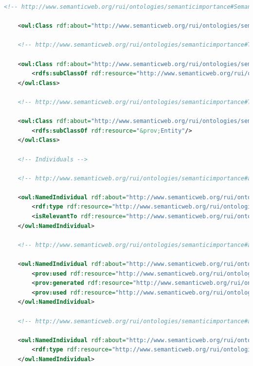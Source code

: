 \begin{lstlisting}[language=XML,caption={Semantic Importance Ontology File (update this file)}]
    <!-- http://www.semanticweb.org/rui/ontologies/semanticimportance#SemanticImportance -->

    <owl:Class rdf:about="http://www.semanticweb.org/rui/ontologies/semanticimportance#SemanticImportance"/>

    <!-- http://www.semanticweb.org/rui/ontologies/semanticimportance#TemporalProvenance -->

    <owl:Class rdf:about="http://www.semanticweb.org/rui/ontologies/semanticimportance#TemporalProvenance">
        <rdfs:subClassOf rdf:resource="http://www.semanticweb.org/rui/ontologies/semanticimportance#Provenance"/>
    </owl:Class>

    <!-- http://www.semanticweb.org/rui/ontologies/semanticimportance#TrustModel -->

    <owl:Class rdf:about="http://www.semanticweb.org/rui/ontologies/semanticimportance#TrustModel">
        <rdfs:subClassOf rdf:resource="&prov;Entity"/>
    </owl:Class>

    <!-- Individuals -->

    <!-- http://www.semanticweb.org/rui/ontologies/semanticimportance#aDataGraph -->

    <owl:NamedIndividual rdf:about="http://www.semanticweb.org/rui/ontologies/semanticimportance#aDataGraph">
        <rdf:type rdf:resource="http://www.semanticweb.org/rui/ontologies/semanticimportance#DataGraph"/>
        <isRelevantTo rdf:resource="http://www.semanticweb.org/rui/ontologies/semanticimportance#aTargetQuery"/>
    </owl:NamedIndividual>

    <!-- http://www.semanticweb.org/rui/ontologies/semanticimportance#aDataItemIsUsedByQueryEngineForResults -->

    <owl:NamedIndividual rdf:about="http://www.semanticweb.org/rui/ontologies/semanticimportance#aDataItemIsUsedByQueryEngineForResults">
        <prov:used rdf:resource="http://www.semanticweb.org/rui/ontologies/semanticimportance#aDataGraph"/>
        <prov:generated rdf:resource="http://www.semanticweb.org/rui/ontologies/semanticimportance#aQueryResult"/>
        <prov:used rdf:resource="http://www.semanticweb.org/rui/ontologies/semanticimportance#stardogQueryEngine"/>
    </owl:NamedIndividual>

    <!-- http://www.semanticweb.org/rui/ontologies/semanticimportance#aQueryResult -->

    <owl:NamedIndividual rdf:about="http://www.semanticweb.org/rui/ontologies/semanticimportance#aQueryResult">
        <rdf:type rdf:resource="http://www.semanticweb.org/rui/ontologies/semanticimportance#QueryResult"/>
    </owl:NamedIndividual>


\end{lstlisting}

